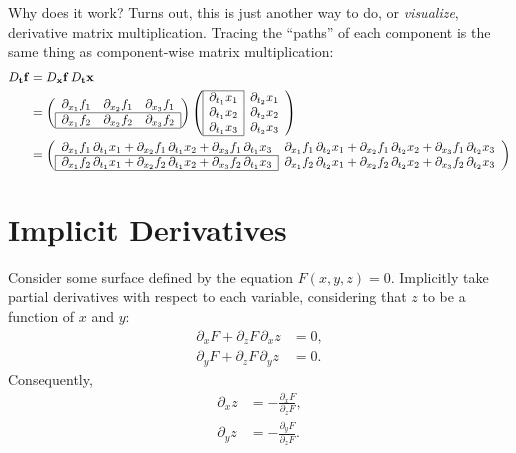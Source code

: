 \documentclass[11pt]{article}
\renewcommand{\vec}[1]{\mathbf{#1}}
\begin{document}
Why does it work? Turns out, this is just another way to do, or \emph{visualize}, derivative matrix multiplication. Tracing the ``paths'' of each component is the same thing as component-wise matrix multiplication:
\begin{align*}
    D_{\vec t}\vec f &= D_{\vec x}\vec f \, D_{\vec t} \vec x \\
    &=
    \left(\begin{array}{ccc}
        \partial_{x_1} f_1 & \partial_{x_2} f_1 & \partial_{x_3} f_1 \\ \hline
        \multicolumn{1}{|c}{\partial_{x_1} f_2} & \partial_{x_2} f_2 & \multicolumn{1}{c|}{\partial_{x_3} f_2} \\ \hline
    \end{array}\right)
    \left(\begin{array}{|c|c}
        \cline{1-1}
        \partial_{t_1} x_1 & \partial_{t_2} x_1 \\
        \partial_{t_1} x_2 & \partial_{t_2} x_2 \\
        \partial_{t_1} x_3 & \partial_{t_2} x_3 \\
        \cline{1-1}
    \end{array}\right) \\
    &=
    \left(\begin{array}{cc}
        \partial_{x_1} f_1 \, \partial_{t_1} x_1 + \partial_{x_2} f_1 \, \partial_{t_1} x_2 + \partial_{x_3} f_1 \, \partial_{t_1} x_3 &
        \partial_{x_1} f_1 \, \partial_{t_2} x_1 + \partial_{x_2} f_1 \, \partial_{t_2} x_2 + \partial_{x_3} f_1 \, \partial_{t_2} x_3 \\
        \cline{1-1}
        \multicolumn{1}{|c|}{\partial_{x_1} f_2 \, \partial_{t_1} x_1 + \partial_{x_2} f_2 \, \partial_{t_1} x_2 + \partial_{x_3} f_2 \, \partial_{t_1} x_3} &
        \partial_{x_1} f_2 \, \partial_{t_2} x_1 + \partial_{x_2} f_2 \, \partial_{t_2} x_2 + \partial_{x_3} f_2 \, \partial_{t_2} x_3 \\
        \cline{1-1}
    \end{array}\right)
\end{align*}


\section*{Implicit Derivatives}

Consider some surface defined by the equation \(F(x, y, z) = 0\). Implicitly take partial derivatives with respect to each variable, considering that \(z\) to be a function of \(x\) and \(y\):
\begin{align*}
    \partial_x F + \partial_z F \, \partial_x z &= 0, \\
    \partial_y F + \partial_z F \, \partial_y z &= 0.
\end{align*}
Consequently,
\begin{align*}
    \partial_x z &= -\frac{\partial_x F}{\partial_z F}, \\
    \partial_y z &= -\frac{\partial_y F}{\partial_z F}. \\
\end{align*}
\end{document}
